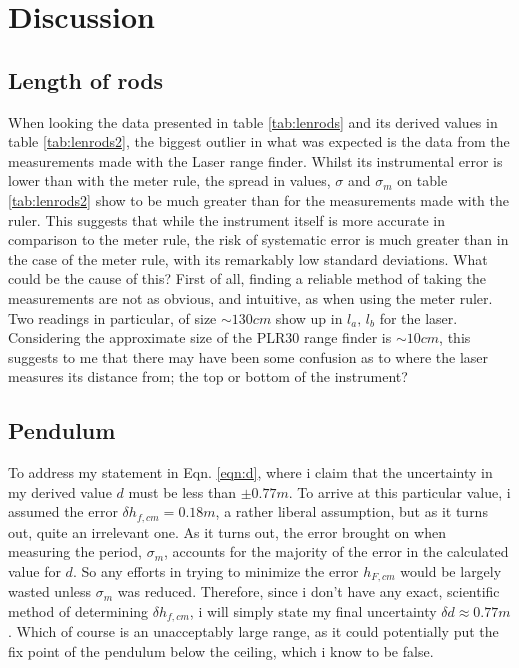 \documentclass[11pt,a4paper]{article}
\begin{document}
\section{\label{sec:disc}Discussion}
  \subsection{Length of rods}
    When looking the data presented in table \ref{tab:lenrods} and its derived values in table \ref{tab:lenrods2}, the biggest outlier in what was expected is the data from the measurements made with the Laser range finder. Whilst its instrumental error is lower than with the meter rule, the spread in values, $\sigma$ and $\sigma_m$ on table \ref{tab:lenrods2} show to be much greater than for the measurements made with the ruler. This suggests that while the instrument itself is more accurate in comparison to the meter rule, the risk of systematic error is much greater than in the case of the meter rule, with its remarkably low standard deviations. What could be the cause of this? First of all, finding a reliable method of taking the measurements are not as obvious, and intuitive, as when using the meter ruler. Two readings in particular, of size $\sim 130cm$ show up in $l_a,\, l_b$ for the laser. Considering the approximate size of the PLR30 range finder is $\sim 10cm$, this suggests to me that there may have been some confusion as to where the laser measures its distance from; the top or bottom of the instrument? 

  \subsection{Pendulum}
    To address my statement in Eqn. \ref{eqn:d}, where i claim that the uncertainty in my derived value $d$ must be less than $\pm 0.77m$. To arrive at this particular value, i assumed the error $\delta h_{f, cm} = 0.18m$, a rather liberal assumption, but as it turns out, quite an irrelevant one. As it turns out, the error brought on when measuring the period, $\sigma_m$, accounts for the majority of the error in the calculated value for $d$. So any efforts in trying to minimize the error $h_{F, cm}$ would be largely wasted unless $\sigma_m$ was reduced. Therefore, since i don't have any exact, scientific method of determining $\delta h_{f, cm}$, i will simply state my final uncertainty $\delta d \approx 0.77m$. Which of course is an unacceptably large range, as it could potentially put the fix point of the pendulum below the ceiling, which i know to be false.
\end{document}
